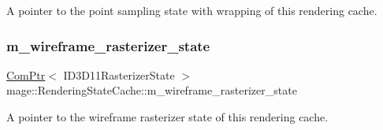 A pointer to the point sampling state with wrapping of this rendering cache. \hypertarget{structmage_1_1_rendering_state_cache_a2fddb539c6cb42feb3c54b73ad2fe800}{}\label{structmage_1_1_rendering_state_cache_a2fddb539c6cb42feb3c54b73ad2fe800} 
\subsubsection{\texorpdfstring{m\+\_\+wireframe\+\_\+rasterizer\+\_\+state}{m\_wireframe\_rasterizer\_state}}
{\footnotesize\ttfamily \hyperlink{namespacemage_ae74f374780900893caa5555d1031fd79}{Com\+Ptr}$<$ I\+D3\+D11\+Rasterizer\+State $>$ mage\+::\+Rendering\+State\+Cache\+::m\+\_\+wireframe\+\_\+rasterizer\+\_\+state\hspace{0.3cm}{\ttfamily [private]}}

A pointer to the wireframe rasterizer state of this rendering cache. 